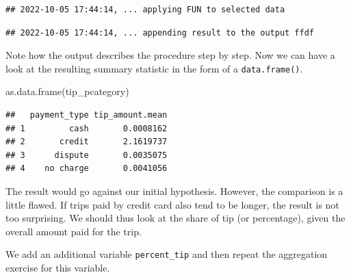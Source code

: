 \documentclass[
  12pt,
]{style/krantz}
\newenvironment{Shaded}{\begin{snugshade}}{\end{snugshade}}
\newcommand{\AttributeTok}[1]{\textcolor[rgb]{0.77,0.63,0.00}{#1}}
\newcommand{\CommentTok}[1]{\textcolor[rgb]{0.56,0.35,0.01}{\textit{#1}}}
\newcommand{\ConstantTok}[1]{\textcolor[rgb]{0.00,0.00,0.00}{#1}}
\newcommand{\ControlFlowTok}[1]{\textcolor[rgb]{0.13,0.29,0.53}{\textbf{#1}}}
\newcommand{\DecValTok}[1]{\textcolor[rgb]{0.00,0.00,0.81}{#1}}
\newcommand{\FunctionTok}[1]{\textcolor[rgb]{0.00,0.00,0.00}{#1}}
\newcommand{\NormalTok}[1]{#1}
\newcommand{\OtherTok}[1]{\textcolor[rgb]{0.56,0.35,0.01}{#1}}
\newcommand{\SpecialCharTok}[1]{\textcolor[rgb]{0.00,0.00,0.00}{#1}}
\begin{document}
\begin{verbatim}
## 2022-10-05 17:44:14, ... applying FUN to selected data
\end{verbatim}

\begin{verbatim}
## 2022-10-05 17:44:14, ... appending result to the output ffdf
\end{verbatim}

Note how the output describes the procedure step by step. Now we can have a look at the resulting summary statistic in the form of a \texttt{data.frame()}.

\begin{Shaded}
\begin{Highlighting}[]
\FunctionTok{as.data.frame}\NormalTok{(tip\_pcategory)}
\end{Highlighting}
\end{Shaded}

\begin{verbatim}
##   payment_type tip_amount.mean
## 1         cash       0.0008162
## 2       credit       2.1619737
## 3      dispute       0.0035075
## 4    no charge       0.0041056
\end{verbatim}

The result would go against our initial hypothesis. However, the comparison is a little flawed. If trips paid by credit card also tend to be longer, the result is not too surprising. We should thus look at the share of tip (or percentage), given the overall amount paid for the trip.

We add an additional variable \texttt{percent\_tip} and then repeat the aggregation exercise for this variable.

\begin{Shaded}
\end{Shaded}
\end{document}
